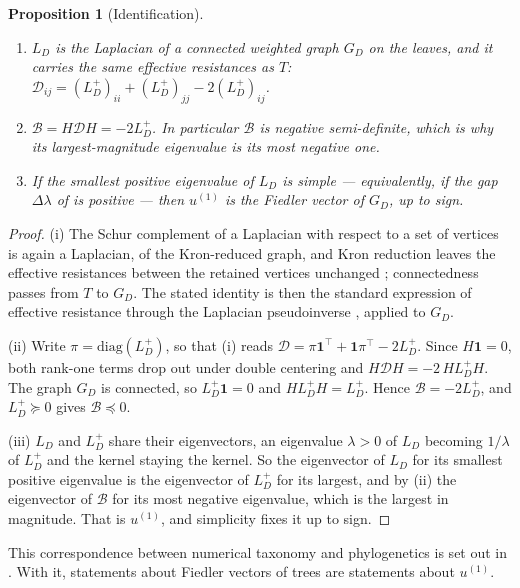 \documentclass[11pt]{article}
\newtheorem{proposition}{Proposition}
\begin{document}
\begin{proposition}[Identification]
\label{prop:identification}
\leavevmode
\begin{enumerate}
\item[(i)] $L_D$ is the Laplacian of a connected weighted graph $G_D$ on the leaves, and it
carries the same effective resistances as $T$:
$\mathcal{D}_{ij} = (L_D^{+})_{ii} + (L_D^{+})_{jj} - 2 (L_D^{+})_{ij}$.
\item[(ii)] $\mathcal{B} = H\mathcal{D}H = -2L_D^{+}$. In particular $\mathcal{B}$ is negative
semi-definite, which is why its largest-magnitude eigenvalue is its most negative one.
\item[(iii)] If the smallest positive eigenvalue of $L_D$ is simple --- equivalently, if the
gap $\Delta\lambda$ of  is positive --- then $u^{(1)}$ is the Fiedler
vector of $G_D$, up to sign.
\end{enumerate}
\end{proposition}

\begin{proof}
(i) The Schur complement of a Laplacian with respect to a set of vertices is again a
Laplacian, of the Kron-reduced graph, and Kron reduction leaves the effective resistances
between the retained vertices unchanged \cite{dorfler2013kron}; connectedness passes from
$T$ to $G_D$. The stated identity is then the standard expression of effective resistance
through the Laplacian pseudoinverse \cite{klein1993resistance}, applied to $G_D$.

(ii) Write $\pi = \mathrm{diag}(L_D^{+})$, so that (i) reads
$\mathcal{D} = \pi \mathbf{1}^\top + \mathbf{1}\pi^\top - 2L_D^{+}$. Since $H\mathbf{1} = 0$,
both rank-one terms drop out under double centering and
$H \mathcal{D} H = -2\, H L_D^{+} H$. The graph $G_D$ is connected, so
$L_D^{+}\mathbf{1} = 0$ and $HL_D^{+}H = L_D^{+}$. Hence $\mathcal{B} = -2L_D^{+}$, and
$L_D^{+} \succeq 0$ gives
$\mathcal{B} \preceq 0$.

(iii) $L_D$ and $L_D^{+}$ share their eigenvectors, an eigenvalue $\lambda > 0$ of $L_D$
becoming $1/\lambda$ of $L_D^{+}$ and the kernel staying the kernel. So the eigenvector of
$L_D$ for its smallest positive eigenvalue is the eigenvector of $L_D^{+}$ for its largest, and by (ii) the
eigenvector of $\mathcal{B}$ for its most negative eigenvalue, which is the largest in
magnitude. That is $u^{(1)}$, and simplicity fixes it up to sign.
\end{proof}

This correspondence between numerical taxonomy and phylogenetics is set out in
\cite{griffing2012}. With it, statements about Fiedler vectors of trees are statements
about $u^{(1)}$.
\end{document}
